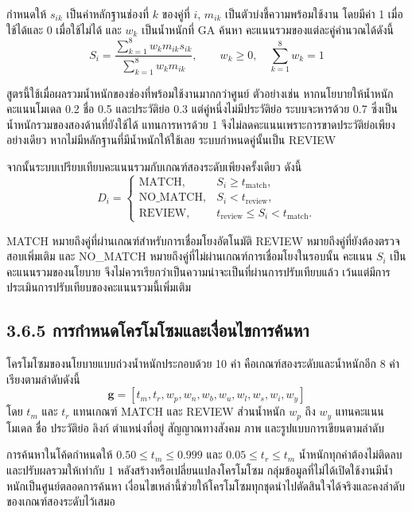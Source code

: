 กำหนดให้ $s_{ik}$ เป็นค่าหลักฐานช่องที่ $k$ ของคู่ที่ $i$, $m_{ik}$ เป็นตัวบ่งชี้ความพร้อมใช้งาน โดยมีค่า 1 เมื่อใช้ได้และ 0 เมื่อใช้ไม่ได้ และ $w_k$ เป็นน้ำหนักที่ GA ค้นหา คะแนนรวมของแต่ละคู่คำนวณได้ดังนี้
\begin{equation*}
S_i=\frac{\sum_{k=1}^{8} w_k m_{ik}s_{ik}}{\sum_{k=1}^{8} w_k m_{ik}},\qquad w_k\geq 0,\quad \sum_{k=1}^{8}w_k=1
\end{equation*}

สูตรนี้ใช้เมื่อผลรวมน้ำหนักของช่องที่พร้อมใช้งานมากกว่าศูนย์ ตัวอย่างเช่น หากนโยบายให้น้ำหนักคะแนนโมเดล 0.2 ชื่อ 0.5 และประวัติย่อ 0.3 แต่คู่หนึ่งไม่มีประวัติย่อ ระบบจะหารด้วย 0.7 ซึ่งเป็นน้ำหนักรวมของสองด้านที่ยังใช้ได้ แทนการหารด้วย 1 จึงไม่ลดคะแนนเพราะการขาดประวัติย่อเพียงอย่างเดียว หากไม่มีหลักฐานที่มีน้ำหนักให้ใช้เลย ระบบกำหนดคู่นั้นเป็น REVIEW

จากนั้นระบบเปรียบเทียบคะแนนรวมกับเกณฑ์สองระดับเพียงครั้งเดียว ดังนี้
\begin{equation*}
D_i=\begin{cases}
\mathrm{MATCH}, & S_i\geq t_{\mathrm{match}},\\
\mathrm{NO\_MATCH}, & S_i<t_{\mathrm{review}},\\
\mathrm{REVIEW}, & t_{\mathrm{review}}\leq S_i<t_{\mathrm{match}}.
\end{cases}
\end{equation*}

MATCH หมายถึงคู่ที่ผ่านเกณฑ์สำหรับการเชื่อมโยงอัตโนมัติ REVIEW หมายถึงคู่ที่ยังต้องตรวจสอบเพิ่มเติม และ NO\_MATCH หมายถึงคู่ที่ไม่ผ่านเกณฑ์การเชื่อมโยงในรอบนั้น คะแนน $S_i$ เป็นคะแนนรวมของนโยบาย จึงไม่ควรเรียกว่าเป็นความน่าจะเป็นที่ผ่านการปรับเทียบแล้ว เว้นแต่มีการประเมินการปรับเทียบของคะแนนรวมนี้เพิ่มเติม

\subsection*{3.6.5 การกำหนดโครโมโซมและเงื่อนไขการค้นหา}
โครโมโซมของนโยบายแบบถ่วงน้ำหนักประกอบด้วย 10 ค่า คือเกณฑ์สองระดับและน้ำหนักอีก 8 ค่า เรียงตามลำดับดังนี้
\begin{equation*}
\boldsymbol{g}=[t_m,t_r,w_p,w_n,w_b,w_u,w_l,w_s,w_i,w_y]
\end{equation*}
โดย $t_m$ และ $t_r$ แทนเกณฑ์ MATCH และ REVIEW ส่วนน้ำหนัก $w_p$ ถึง $w_y$ แทนคะแนนโมเดล ชื่อ ประวัติย่อ ลิงก์ ตำแหน่งที่อยู่ สัญญาณทางสังคม ภาพ และรูปแบบการเขียนตามลำดับ

การค้นหาในโค้ดกำหนดให้ $0.50\leq t_m\leq0.999$ และ $0.05\leq t_r\leq t_m$ น้ำหนักทุกค่าต้องไม่ติดลบ และปรับผลรวมให้เท่ากับ 1 หลังสร้างหรือเปลี่ยนแปลงโครโมโซม กลุ่มข้อมูลที่ไม่ได้เปิดใช้งานมีน้ำหนักเป็นศูนย์ตลอดการค้นหา เงื่อนไขเหล่านี้ช่วยให้โครโมโซมทุกชุดนำไปตัดสินใจได้จริงและคงลำดับของเกณฑ์สองระดับไว้เสมอ

